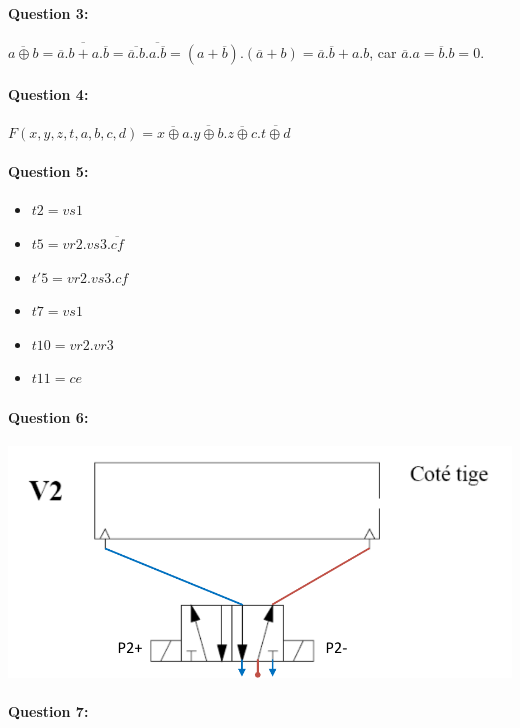 \paragraph{Question 3:} $\overline{a \oplus b} = \overline{\overline{a}.b+a.\overline{b}}= \overline{\overline{a}.b}.\overline{a.\overline{b}} = (a+\overline{b}).(\overline{a}+b) = \overline{a}.\overline{b} + a.b$, car $\overline{a}.a=\overline{b}.b=0$.

\paragraph{Question 4:} $F(x,y,z,t,a,b,c,d)=\overline{x \oplus a}.\overline{y \oplus b}.\overline{z \oplus c}.\overline{t \oplus d}$

\paragraph{Question 5:}

\begin{itemize}
 \item $t2=vs1$
 \item $t5=vr2.vs3.\overline{cf}$
 \item $t'5=vr2.vs3.cf$
 \item $t7=vs1$
 \item $t10=vr2.vr3$
 \item $t11=ce$
\end{itemize}

\newpage

\paragraph{Question 6:}

\begin{center}
 \includegraphics[width=0.7\linewidth]{img/distrib_cor}
\end{center}

\paragraph{Question 7:}

